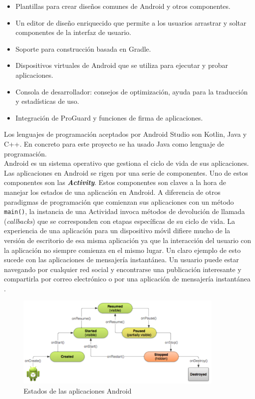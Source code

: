 \begin {itemize}
\item Plantillas para crear dise\~nos comunes de Android y otros componentes.
\item Un editor de dise\~no enriquecido que permite a los usuarios arrastrar y soltar componentes de la interfaz de usuario.
\item Soporte para construcci\'on basada en Gradle.
\item Dispositivos virtuales de Android que se utiliza para ejecutar y probar aplicaciones.
\item Consola de desarrollador: consejos de optimizaci\'on, ayuda para la traducci\'on y estad\'isticas de uso.
\item Integraci\'on de ProGuard y funciones de firma de aplicaciones.
\end {itemize}



Los lenguajes de programaci\'on aceptados por Android Studio son Kotlin, Java y C++. En concreto para este proyecto se ha usado Java como lenguaje de programaci\'on.\\

Android es un sistema operativo que gestiona el ciclo de vida de sus aplicaciones. Las aplicaciones en Android se rigen por una serie de componentes. Uno de estos componentes son las \textbf{\textit{Activity}}. Estos componentes son claves a la hora de manejar los estados de una aplicaci\'on en Android. A diferencia de otros paradigmas de programaci\'on que comienzan sus aplicaciones con un m\'etodo \texttt{main()}, la instancia de una Actividad invoca m\'etodos de devoluci\'on de llamada (\emph{callbacks}) que se corresponden con etapas espec\'ificas de su ciclo de vida. La experiencia de una aplicaci\'on para un dispositivo m\'ovil difiere mucho de la versi\'on de escritorio de esa misma aplicaci\'on ya que la interacci\'on del usuario con la aplicaci\'on no siempre comienza en el mismo lugar. Un claro ejemplo de esto sucede con las aplicaciones de mensajer\'ia instant\'anea. Un usuario puede estar navegando por cualquier red social y encontrarse una publicaci\'on interesante y compartirla por correo electr\'onico o por una aplicaci\'on de mensajer\'ia instant\'anea \citep*{bookandroid}.\\

 \begin{figure}[!h]
    \centering
    \includegraphics[width=0.90\textwidth]{./Imagenes/Vectorial/lifecycle-states.pdf}
    \caption{Estados de las aplicaciones Android}
\label{Fig:estados}
\end{figure}

